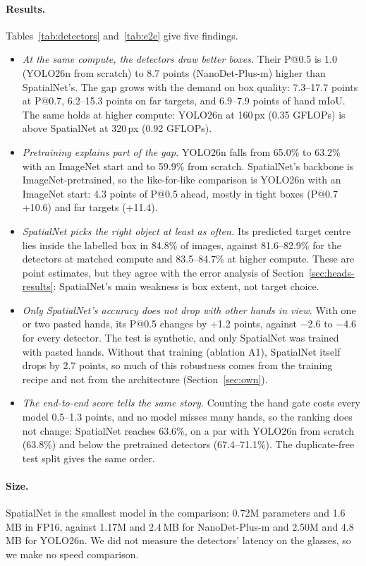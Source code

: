 \paragraph{Results.} Tables~\ref{tab:detectors} and~\ref{tab:e2e} give five findings.
\begin{itemize}
\item \emph{At the same compute, the detectors draw better boxes.} Their P@0.5 is 1.0 (YOLO26n from scratch) to 8.7 points (NanoDet-Plus-m) higher than SpatialNet's. The gap grows with the demand on box quality: 7.3--17.7 points at P@0.7, 6.2--15.3 points on far targets, and 6.9--7.9 points of hand mIoU. The same holds at higher compute: YOLO26n at 160\,px (0.35 GFLOPs) is above SpatialNet at 320\,px (0.92 GFLOPs).
\item \emph{Pretraining explains part of the gap.} YOLO26n falls from 65.0\% to 63.2\% with an ImageNet start and to 59.9\% from scratch. SpatialNet's backbone is ImageNet-pretrained, so the like-for-like comparison is YOLO26n with an ImageNet start: 4.3 points of P@0.5 ahead, mostly in tight boxes (P@0.7 +10.6) and far targets (+11.4).
\item \emph{SpatialNet picks the right object at least as often.} Its predicted target centre lies inside the labelled box in 84.8\% of images, against 81.6--82.9\% for the detectors at matched compute and 83.5--84.7\% at higher compute. These are point estimates, but they agree with the error analysis of Section~\ref{sec:heads-results}: SpatialNet's main weakness is box extent, not target choice.
\item \emph{Only SpatialNet's accuracy does not drop with other hands in view.} With one or two pasted hands, its P@0.5 changes by $+$1.2 points, against $-$2.6 to $-$4.6 for every detector. The test is synthetic, and only SpatialNet was trained with pasted hands. Without that training (ablation A1), SpatialNet itself drops by 2.7 points, so much of this robustness comes from the training recipe and not from the architecture (Section~\ref{sec:own}).
\item \emph{The end-to-end score tells the same story.} Counting the hand gate costs every model 0.5--1.3 points, and no model misses many hands, so the ranking does not change: SpatialNet reaches 63.6\%, on a par with YOLO26n from scratch (63.8\%) and below the pretrained detectors (67.4--71.1\%). The duplicate-free test split gives the same order.
\end{itemize}
\paragraph{Size.} SpatialNet is the smallest model in the comparison: 0.72M parameters and 1.6\,MB in FP16, against 1.17M and 2.4\,MB for NanoDet-Plus-m and 2.50M and 4.8\,MB for YOLO26n. We did not measure the detectors' latency on the glasses, so we make no speed comparison.

